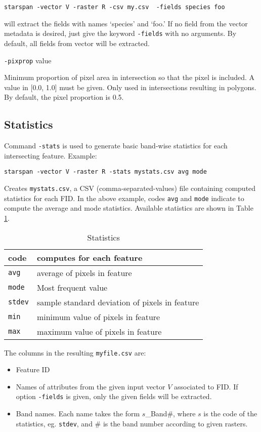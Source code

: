 \documentclass{elsart}
\begin{document}
   \verb|starspan -vector V -raster R -csv my.csv  -fields species foo|

will extract the fields with names `species' and `foo.' If no field from the
vector metadata is desired, just give the keyword \verb|-fields| with no
arguments. By default, all fields from vector will be extracted.

	\verb|-pixprop| value

Minimum proportion of pixel area in intersection so that the pixel is included.
A value in [0.0, 1.0] must be given.
Only used in intersections resulting in polygons. 
By default, the pixel proportion is 0.5. 

\subsection{Statistics}

Command \verb|-stats| is used to generate basic band-wise statistics for each
intersecting feature. Example:

	\verb|starspan -vector V -raster R -stats mystats.csv avg mode|

Creates \verb|mystats.csv|, a CSV (comma-separated-values) file containing
computed statistics for each FID. In the above example, codes \verb|avg| and
\verb|mode|
indicate to compute the average and mode statistics. Available statistics 
are shown in Table \ref{table-stats}.
\begin{table}[!ht]
\centering
\caption{Statistics}
\begin{tabular}{|l|l|}
\hline 
 code        & computes for each feature\\
\hline
\verb|avg  |  &   average of pixels in feature\\
\verb|mode |  &   Most frequent value\\
\verb|stdev|  &   sample standard deviation of pixels in feature\\
\verb|min  |  &   minimum value of pixels in feature\\
\verb|max  |  &   maximum value of pixels in feature\\
\hline
\end{tabular}
\label{table-stats}
\end{table}

The columns in the resulting \verb|myfile.csv| are:

	\begin{itemize}
		\item Feature ID 
		\item Names of attributes from the given input vector $V$ associated to FID. 
				If option \verb|-fields| is given, only the given fields will be extracted. 
		\item Band names. Each name takes the form $s$\_Band\#, where $s$
				is the code of the statistics, eg. \verb|stdev|, and \# is the band number 
				according to given rasters.  
	\end{itemize}
\end{document}
